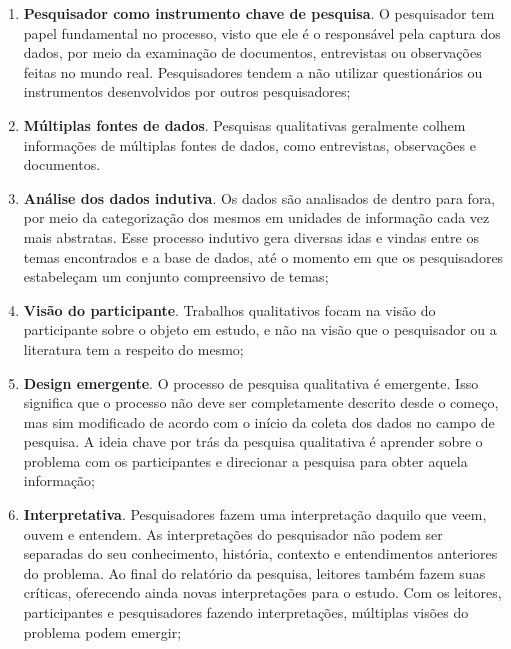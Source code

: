 \begin{enumerate}
  
  \item \textbf{Pesquisador como instrumento chave de pesquisa}. O pesquisador
  tem papel fundamental no processo, visto que ele é o responsável pela captura dos
  dados, por meio da examinação de documentos, entrevistas ou observações feitas
  no mundo real. Pesquisadores tendem a não utilizar questionários ou
  instrumentos desenvolvidos por outros pesquisadores;
  
  \item \textbf{Múltiplas fontes de dados}. Pesquisas qualitativas geralmente
  colhem informações de múltiplas fontes de dados, como entrevistas,
  observações e documentos.
  
  \item \textbf{Análise dos dados indutiva}. Os dados são analisados de dentro
  para fora, por meio da categorização dos mesmos em unidades de informação cada
  vez mais abstratas. Esse processo indutivo gera diversas idas e vindas entre
  os temas encontrados e a base de dados, até o momento em que os pesquisadores
  estabeleçam um conjunto compreensivo de temas;
  
  \item \textbf{Visão do participante}. Trabalhos qualitativos focam na visão do
  participante sobre o objeto em estudo, e não na visão que o pesquisador ou a
  literatura tem a respeito do mesmo;
  
  \item \textbf{Design emergente}. O processo de pesquisa qualitativa é
  emergente. Isso significa que o processo não deve ser completamente descrito
  desde o começo, mas sim modificado de acordo com o início da coleta dos dados
  no campo de pesquisa. A ideia chave por trás da pesquisa qualitativa é
  aprender sobre o problema com os participantes e direcionar a pesquisa para
  obter aquela informação;
  
  \item \textbf{Interpretativa}. Pesquisadores fazem uma interpretação daquilo
  que veem, ouvem e entendem. As interpretações do pesquisador não podem ser
  separadas do seu conhecimento, história, contexto e entendimentos anteriores
  do problema. Ao final do relatório da pesquisa, leitores também fazem suas
  críticas, oferecendo ainda novas interpretações para o estudo. Com os
  leitores, participantes e pesquisadores fazendo interpretações, múltiplas
  visões do problema podem emergir;
  
\end{enumerate} 

